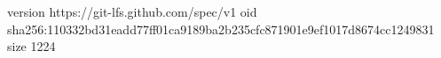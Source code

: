version https://git-lfs.github.com/spec/v1
oid sha256:110332bd31eadd77ff01ca9189ba2b235cfc871901e9ef1017d8674cc1249831
size 1224
